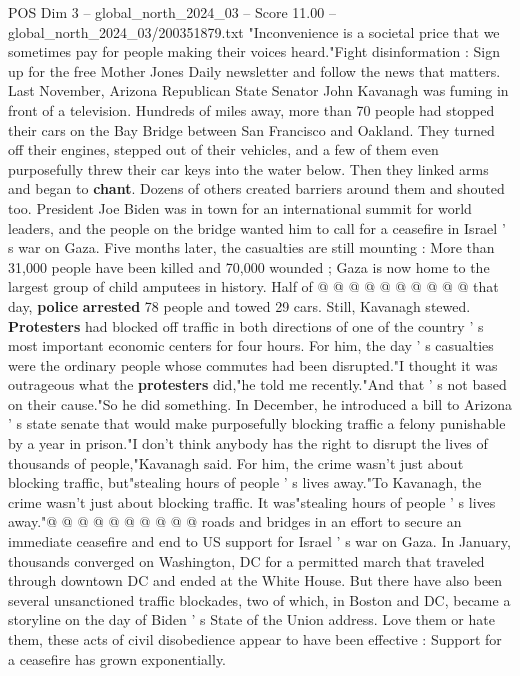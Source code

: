 \begin{textsample}{POS Dim 3 – global\_north\_2024\_03 – Score 11.00 – global\_north\_2024\_03/200351879.txt}  \label{ex:f3_pos_272}
"Inconvenience is a societal price that we sometimes pay for people making their voices heard."Fight disinformation : Sign up for the free Mother Jones Daily newsletter and follow the news that matters.
Last November, Arizona Republican State Senator John Kavanagh was fuming in front of a television.
Hundreds of miles away, more than 70 people had stopped their cars on the Bay Bridge between San Francisco and Oakland.
They turned off their engines, stepped out of their vehicles, and a few of them even purposefully threw their car keys into the water below.
Then they linked arms and began to \textbf{chant}.
Dozens of others created barriers around them and shouted too.
President Joe Biden was in town for an international summit for world leaders, and the people on the bridge wanted him to call for a ceasefire in Israel ' s war on Gaza.
Five months later, the casualties are still mounting : More than 31,000 people have been killed and 70,000 wounded ; Gaza is now home to the largest group of child amputees in history.
Half of @ @ @ @ @ @ @ @ @ @ that day, \textbf{police} \textbf{arrested} 78 people and towed 29 cars.
Still, Kavanagh stewed. \textbf{Protesters} had blocked off traffic in both directions of one of the country ' s most important economic centers for four hours.
For him, the day ' s casualties were the ordinary people whose commutes had been disrupted."I thought it was outrageous what the \textbf{protesters} did,"he told me recently."And that ' s not based on their cause."So he did something.
In December, he introduced a bill to Arizona ' s state senate that would make purposefully blocking traffic a felony punishable by a year in prison."I don't think anybody has the right to disrupt the lives of thousands of people,"Kavanagh said.
For him, the crime wasn't just about blocking traffic, but"stealing hours of people ' s lives away."To Kavanagh, the crime wasn't just about blocking traffic.
It was"stealing hours of people ' s lives away."@ @ @ @ @ @ @ @ @ @ roads and bridges in an effort to secure an immediate ceasefire and end to US support for Israel ' s war on Gaza.
In January, thousands converged on Washington, DC for a permitted march that traveled through downtown DC and ended at the White House.
But there have also been several unsanctioned traffic blockades, two of which, in Boston and DC, became a storyline on the day of Biden ' s State of the Union address.
Love them or hate them, these acts of civil disobedience appear to have been effective : Support for a ceasefire has grown exponentially.

\end{textsample}
